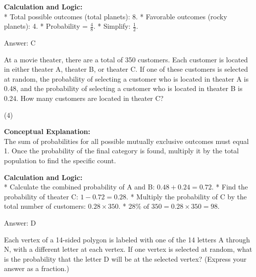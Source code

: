 \documentclass[11pt,paper=a4,answers]{exam}
\begin{document}
\begin{questions}
\begin{solution}
\textbf{Calculation and Logic:} \\
* Total possible outcomes (total planets): 8.
* Favorable outcomes (rocky planets): 4.
* Probability = $\frac{4}{8}$.
* Simplify: $\frac{1}{2}$.

\vspace{30pt}

Answer: \colorbox{yellow!100}{C}
\end{solution}

\vspace{60pt}

\question
At a movie theater, there are a total of 350 customers. Each customer is located in either theater A, theater B, or theater C. If one of these customers is selected at random, the probability of selecting a customer who is located in theater A is 0.48, and the probability of selecting a customer who is located in theater B is 0.24. How many customers are located in theater C?
\begin{tasks}(4)
\end{tasks}

\begin{solution}
\textbf{Conceptual Explanation:} \\
The sum of probabilities for all possible mutually exclusive outcomes must equal 1. Once the probability of the final category is found, multiply it by the total population to find the specific count.

\vspace{30pt}

\textbf{Calculation and Logic:} \\
* Calculate the combined probability of A and B: $0.48 + 0.24 = 0.72$.
* Find the probability of theater C: $1 - 0.72 = 0.28$.
* Multiply the probability of C by the total number of customers: $0.28 \times 350$.
* $28\% \text{ of } 350 = 0.28 \times 350 = 98$.

\vspace{30pt}

Answer: \colorbox{yellow!100}{D}
\end{solution}

\vspace{60pt}

\question
Each vertex of a 14-sided polygon is labeled with one of the 14 letters A through N, with a different letter at each vertex. If one vertex is selected at random, what is the probability that the letter D will be at the selected vertex? (Express your answer as a fraction.)


\end{questions}
\end{document}
